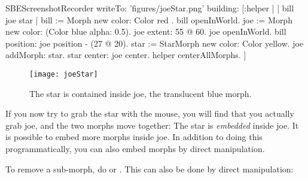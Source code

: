 \documentclass[a4paper,10pt,twoside]{book}
\begin{document}
\begin{ExecuteSmalltalkScript}
SBEScreenshotRecorder writeTo: 'figures/joeStar.png' building: [:helper |
	| bill joe star |
	bill := Morph new color: Color red .
	bill openInWorld.
	joe := Morph new color: (Color blue alpha: 0.5).
	joe extent: 55 @ 60.
	joe openInWorld.
	bill position: joe position - (27 @ 20).
	star := StarMorph new color: Color yellow.
	joe addMorph: star.
	star center: joe center.
	helper centerAllMorphs.
]
\end{ExecuteSmalltalkScript}
\begin{figure}[ht]
	\centerline{\texttt{[image: joeStar]}}
	\caption{The star is contained inside joe, the translucent blue morph.
		\label{fig:joeStar}}
\end{figure}

If you now try to grab the star with the mouse, you will find that you actually grab joe, and the two morphs move together:
The star is \emph{embedded} inside joe.
It is possible to embed more morphs inside joe.  
In addition to doing this programmatically, you can also embed morphs by direct manipulation.



To remove a sub-morph, do    or  .
This can also be done by direct manipulation:

\end{document}
